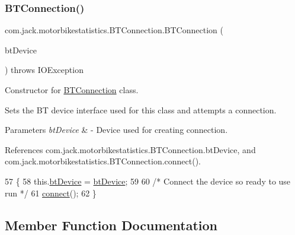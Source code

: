 \subsubsection{\texorpdfstring{B\+T\+Connection()}{BTConnection()}}
{\footnotesize\ttfamily com.\+jack.\+motorbikestatistics.\+B\+T\+Connection.\+B\+T\+Connection (\begin{DoxyParamCaption}\item[{Bluetooth\+Device}]{bt\+Device }\end{DoxyParamCaption}) throws I\+O\+Exception\hspace{0.3cm}{\ttfamily [inline]}}



Constructor for \hyperlink{classcom_1_1jack_1_1motorbikestatistics_1_1_b_t_connection}{B\+T\+Connection} class. 

Sets the BT device interface used for this class and attempts a connection.


\begin{DoxyParams}{Parameters}
{\em bt\+Device} & -\/ Device used for creating connection. \\
\hline
\end{DoxyParams}


References com.\+jack.\+motorbikestatistics.\+B\+T\+Connection.\+bt\+Device, and com.\+jack.\+motorbikestatistics.\+B\+T\+Connection.\+connect().


\begin{DoxyCode}
57                                \{
58         this.\hyperlink{classcom_1_1jack_1_1motorbikestatistics_1_1_b_t_connection_af49e78cef4253d96f009a9a1473e038d}{btDevice} = \hyperlink{classcom_1_1jack_1_1motorbikestatistics_1_1_b_t_connection_af49e78cef4253d96f009a9a1473e038d}{btDevice};
59 
60         \textcolor{comment}{/* Connect the device so ready to use run */}
61         \hyperlink{classcom_1_1jack_1_1motorbikestatistics_1_1_b_t_connection_a4c1b8ebff8a40a9cddd77a55b59b45af}{connect}();
62     \}
\end{DoxyCode}


\subsection{Member Function Documentation}
\mbox{\label{classcom_1_1jack_1_1motorbikestatistics_1_1_b_t_connection_aae8ee75e78f5beff98572bf3b13a60b8}} 
